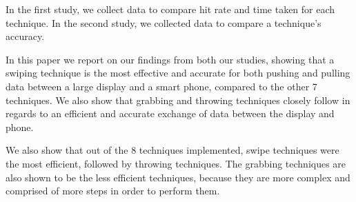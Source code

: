 In the first study, we collect data to compare hit rate and time taken for each technique.
In the second study, we collected data to compare a technique's accuracy.

In this paper we report on our findings from both our studies, showing that a swiping technique is the most effective and accurate for both pushing and pulling data between a large display and a smart phone, compared to the other 7 techniques. 
We also show that grabbing and throwing techniques closely follow in regards to an efficient and accurate exchange of data between the display and phone. 

We also show that out of the 8 techniques implemented, swipe techniques were the most efficient, followed by throwing techniques. 
The grabbing techniques are also shown to be the less efficient techniques, because they are more complex and comprised of more steps in order to perform them. 